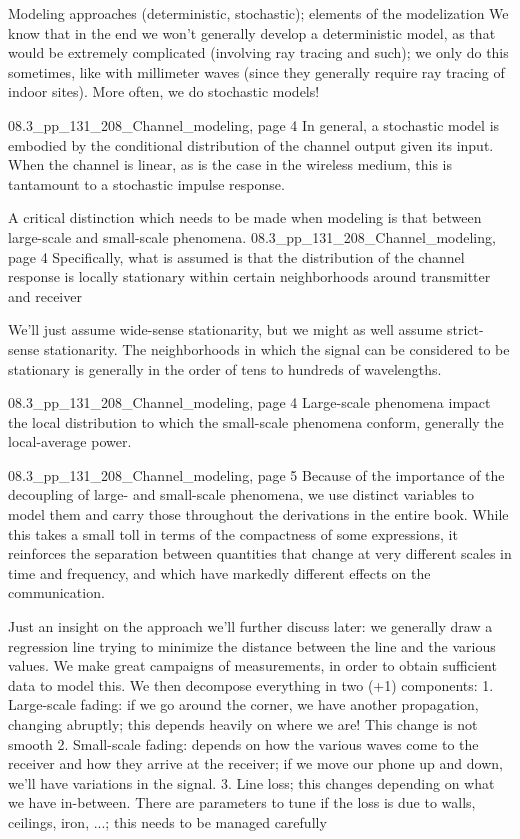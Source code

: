 {{{Modeling approaches (deterministic, stochastic); elements of the modelization We know that in the end we won't generally develop a deterministic model, as that would be extremely complicated (involving ray tracing and such); we only do this sometimes, like with millimeter waves (since they generally require ray tracing of indoor sites). More often, we do stochastic models!

08.3_pp_131_208_Channel_modeling, page 4 In general, a stochastic model is embodied by the conditional distribution of the channel output given its input. When the channel is linear, as is the case in the wireless medium, this is tantamount to a stochastic impulse response.

A critical distinction which needs to be made when modeling is that between large-scale and small-scale phenomena.
08.3_pp_131_208_Channel_modeling, page 4 Specifically, what is assumed is that the distribution of the channel response is locally stationary within certain neighborhoods around transmitter and receiver

We'll just assume wide-sense stationarity, but we might as well assume strict-sense stationarity.
The neighborhoods in which the signal can be considered to be stationary is generally in the order of tens to hundreds of wavelengths.

08.3_pp_131_208_Channel_modeling, page 4 Large-scale phenomena impact the local distribution to which the small-scale phenomena conform, generally the local-average power.

08.3_pp_131_208_Channel_modeling, page 5 Because of the importance of the decoupling of large- and small-scale phenomena,
we use distinct variables to model them and carry those throughout the derivations in the entire book. While this takes a small toll in terms of the compactness of some expressions, it reinforces the separation between quantities that change at very different scales in time and frequency, and which have markedly different effects on the communication.

Just an insight on the approach we'll further discuss later: we generally draw a regression line trying to minimize the distance between the line and the various values.
We make great campaigns of measurements, in order to obtain sufficient data to model this. We then decompose everything in two (+1) components:
1. Large-scale fading: if we go around the corner, we have another propagation,
changing abruptly; this depends heavily on where we are! This change is not smooth 2. Small-scale fading: depends on how the various waves come to the receiver and how they arrive at the receiver; if we move our phone up and down, we'll have variations in the signal.
3. Line loss; this changes depending on what we have in-between. There are parameters to tune if the loss is due to walls, ceilings, iron, ...; this needs to be managed carefully

}}}
